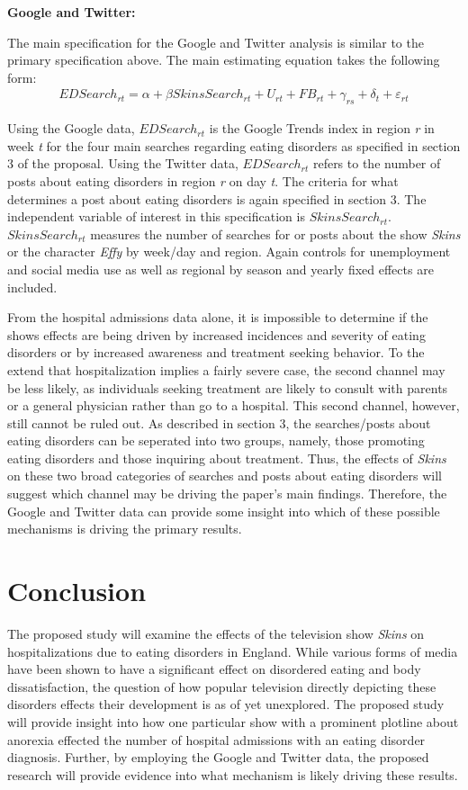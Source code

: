 \documentclass[12pt]{article}
\begin{document}
{\bf Google and Twitter:}

The main specification for the Google and Twitter analysis is similar to the primary specification above. The main estimating equation takes the following form:
\begin{eqnarray*}
	EDSearch_{rt} = \alpha + \beta SkinsSearch_{rt} + U_{rt} + FB_{rt} + \gamma_{rs} + \delta_t + \varepsilon_{rt}
\end{eqnarray*}

Using the Google data, $EDSearch_{rt}$ is the Google Trends index in region \textit{r} in week \textit{t} for the four main searches regarding eating disorders as specified in section 3 of the proposal. Using the Twitter data, $EDSearch_{rt}$ refers to the number of posts about eating disorders in region \textit{r} on day \textit{t}. The criteria for what determines a post about eating disorders is again specified in section 3. The independent variable of interest in this specification is $SkinsSearch_{rt}$. $SkinsSearch_{rt}$ measures the number of searches for or posts about the show \textit{Skins} or the character \textit{Effy} by week/day and region. Again controls for unemployment and social media use as well as regional by season and yearly fixed effects are included.

From the hospital admissions data alone, it is impossible to determine if the shows effects are being driven by increased incidences and severity of eating disorders or by increased awareness and treatment seeking behavior. To the extend that hospitalization implies a fairly severe case, the second channel may be less likely, as individuals seeking treatment are likely to consult with parents or a general physician rather than go to a hospital. This second channel, however, still cannot be ruled out. As described in section 3, the searches/posts about eating disorders can be seperated into two groups, namely, those promoting eating disorders and those inquiring about treatment. Thus, the effects of \textit{Skins} on these two broad categories of searches and posts about eating disorders will suggest which channel may be driving the paper's main findings.  Therefore, the Google and Twitter data can provide some insight into which of these possible mechanisms is driving the primary results.

\section{Conclusion}

The proposed study will examine the effects of the television show \textit{Skins} on hospitalizations due to eating disorders in England. While various forms of media have been shown to have a significant effect on disordered eating and body dissatisfaction, the question of how popular television directly depicting these disorders effects their development is as of yet unexplored. The proposed study will provide insight into how one particular show with a prominent plotline about anorexia effected the number of hospital admissions with an eating disorder diagnosis. Further, by employing the Google and Twitter data, the proposed research will provide evidence into what mechanism is likely driving these results.
\end{document}

